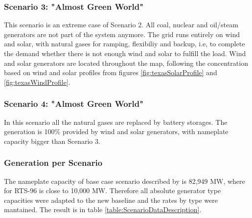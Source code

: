\documentclass[12pt,LUDisStyle,twosided]{book}
\begin{document}
\subsubsection{Scenario 3: "Almost Green World"}

This scenario is an extreme case of Scenario 2. All coal, nuclear and oil/steam generators are not part of the system anymore. The grid runs entirely on wind and solar, with natural gases for ramping, flexibiliy and backup, i.e, to complete the demand whether there is not enough wind and solar to fulfill the load. Wind and solar generators are located throughout the map, following the concentration based on wind and solar profiles from figures \ref{fig:texasSolarProfile} and \ref{fig:texasWindProfile}.

\subsubsection{Scenario 4: "Almost Green World"}

In this scenario all the natural gases are replaced by battery storages. The generation is 100\% provided by wind and solar generators, with nameplate capacity bigger than Scenario 3.

\subsubsection{Generation per Scenario}

The nameplate capacity of base case scenario described by \citeauthor{shavel} is 82,949 MW, where for RTS-96 is close to 10,000 MW. Therefore all absolute generator type capacities were adapted to the new baseline and the rates by type were mantained. The result is in table \ref{table:ScenarioDataDescription}.
\end{document}
